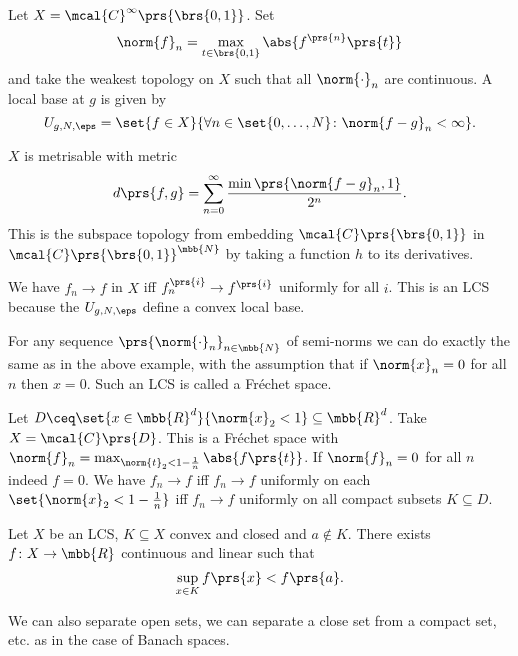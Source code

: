 \documentclass[10pt, twoside]{book}
\begin{document}
\begin{example}
Let $X = \mcal{C}^\infty\prs{\brs{0,1}}$. Set
\[\norm{f}_n = \max_{t \in \brs{0,1}} \abs{f^{\prs{n}}\prs{t}}\]
and take the weakest topology on $X$ such that all $\norm{\cdot}_n$ are continuous.
A local base at $g$ is given by
\[U_{g,N,\eps} = \set{f \in X}{\forall n \in \set{0,\ldots,N} \colon \norm{f-g}_n < \infty} \text{.}\]

$X$ is metrisable with metric
\[d\prs{f,g} = \sum_{n=0}^{\infty} \frac{\min\prs{{\norm{f-g}_n, 1}}}{2^n} \text{.}\]
This is the subspace topology from embedding $\mcal{C}\prs{\brs{0,1}}$ in $\mcal{C}\prs{\brs{0,1}}^{\mbb{N}}$ by taking a function $h$ to its derivatives.

We have $f_n \to f$ in $X$ iff $f^{\prs{i}}_n \to f^{\prs{i}}$ uniformly for all $i$.
This is an LCS because the $U_{g,N,\eps}$ define a convex local base.
\end{example}

\begin{remark}
For any sequence $\prs{\norm{\cdot}_n}_{n \in \mbb{N}}$ of semi-norms we can do exactly the same as in the above example, with the assumption that if $\norm{x}_n = 0$ for all $n$ then $x = 0$. Such an LCS is called a Fréchet space.
\end{remark}

\begin{example}
Let $D \ceq \set{x \in \mbb{R}^d}{\norm{x}_2 < 1} \subseteq \mbb{R}^d$. Take $X = \mcal{C}\prs{D}$. This is a Fréchet space with $\norm{f}_n = \max_{\norm{t}_2 < 1 - \frac{1}{n}} \abs{f\prs{t}}$.
If $\norm{f}_n = 0$ for all $n$ indeed $f = 0$.
We have $f_n \to f$ iff $f_n \to f$ uniformly on each $\set{\norm{x}_2 < 1 - \frac{1}{n}}$ iff $f_n \to f$ uniformly on all compact subsets $K \subseteq D$.
\end{example}

\begin{theorem}
Let $X$ be an LCS, $K \subseteq X$ convex and closed and $a \notin K$. There exists $f \colon X \to \mbb{R}$ continuous and linear such that
\[\sup_{x \in K} f\prs{x} < f\prs{a} \text{.}\]
\end{theorem}

\begin{remark}
We can also separate open sets, we can separate a close set from a compact set, etc. as  in the case of Banach spaces.
\end{remark}
\end{document}
